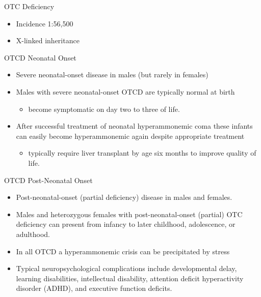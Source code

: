\documentclass[presentation, smaller]{beamer}
\begin{document}
\begin{frame}[label={sec:orgheadline5}]{OTC Deficiency}
\begin{block}{}
\centering
\end{block}
\begin{itemize}
\item Incidence 1:56,500
\item X-linked inheritance
\end{itemize}
\end{frame}

\begin{frame}[label={sec:orgheadline6}]{OTCD Neonatal Onset}
\begin{itemize}
\item Severe neonatal-onset disease in males (but rarely in females)
\item Males with severe neonatal-onset OTCD are typically normal
at birth
\begin{itemize}
\item become symptomatic on day two to three of life.
\end{itemize}
\item After successful treatment of neonatal hyperammonemic coma these
infants can easily become hyperammonemic again despite appropriate
treatment
\begin{itemize}
\item typically require liver transplant by age six months to improve quality of life.
\end{itemize}
\end{itemize}
\end{frame}

\begin{frame}[label={sec:orgheadline7}]{OTCD Post-Neonatal Onset}
\begin{itemize}
\item Post-neonatal-onset (partial deficiency) disease in males and females.
\item Males and heterozygous females with post-neonatal-onset (partial)
OTC deficiency can present from infancy to later childhood,
adolescence, or adulthood.
\item In all OTCD a hyperammonemic crisis can be precipitated by stress
\item Typical neuropsychological complications include developmental delay, learning disabilities,
intellectual disability, attention deficit hyperactivity disorder
(ADHD), and executive function deficits.
\end{itemize}
\end{frame}
\end{document}
